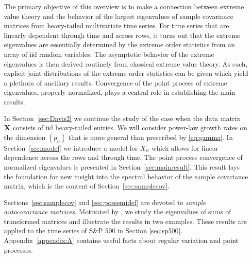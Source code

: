 The primary objective of this overview  is to make a connection between extreme value theory and the behavior of the largest eigenvalues of sample covariance matrices from heavy-tailed multivariate time series.  For time series that are linearly dependent through time and across rows, it turns out that the extreme eigenvalues are essentially determined by the extreme order statistics from an array of iid random variables.  The asymptotic behavior of the extreme eigenvalues is then derived routinely from classical extreme value theory.  As such, explicit joint distributions of the extreme order statistics can be given which yield a plethora of ancillary results.  
Convergence of the point process of extreme eigenvalues, properly normalized, plays a central role in establishing the main results.
\par
In Section~\ref{sec:Davis2} we continue the study of the case when the data matrix ${\mathbf X}$ consists of iid heavy-tailed entries.  We will consider power-law growth rates on the dimension $(p_n)$ that is more general than prescribed by \eqref{eq:gamma}.
In Section~\ref{sec:model} we introduce a model for $X_{it}$ which allows for linear dependence across the rows and through time.
The point process convergence of normalized eigenvalues is presented in Section~\ref{sec:mainresult}.
This result lays the foundation for new insight into the spectral behavior of the sample covariance matrix, which is the content of Section~\ref{sec:samplecov}.

Sections~\ref{sec:samplecov} and \ref{sec:possemidef} are devoted to {\em sample autocovariance matrices}.  Motivated by \cite{lam:yao:2012}, we study the eigenvalues of sums of transformed matrices and illustrate the results in two examples. These results are applied to the time series of S\&P 500 in Section \ref{sec:sp500}.
Appendix~\ref{appendix:A} contains useful facts about regular variation and point processes.




